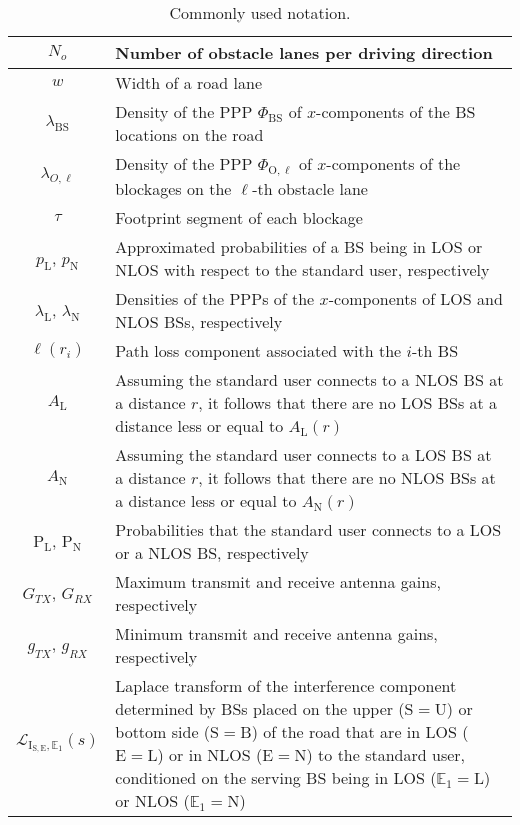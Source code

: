 \documentclass[10pt,journal,a4paper]{IEEEtran}
\begin{document}
\begin{table}[t!]
\centering
\caption{Commonly used notation.}
\label{tab.not}
{\scriptsize
\begin{tabular}{|c|p{6.5cm}|}
\hline $N_o$  & Number of obstacle lanes per driving direction\\
\hline $w$  & Width of a road lane\\
\hline $\lambda_{\mathrm{BS}}$  & Density of the PPP $\Phi_{\mathrm{BS}}$ of $x$-components of the BS locations on the road\\
\hline $\lambda_{O,\ell}$  & Density of the PPP $\Phi_{\mathrm{O},\ell}$ of $x$-components of the blockages on the $\ell$-th obstacle lane\\
\hline $\tau$  & Footprint segment of each blockage\\
\hline $p_\mathrm{L}$, $p_\mathrm{N}$  & Approximated probabilities of a BS being in LOS or NLOS with respect to the standard user, respectively\\
\hline $\lambda_\mathrm{L}$, $\lambda_\mathrm{N}$  & Densities of the PPPs of the $x$-components of LOS and NLOS BSs, respectively\\
\hline $\ell(r_i)$  & Path loss component associated with the $i$-th BS\\
\hline $A_\mathrm{L}$  & Assuming the standard user connects to a NLOS BS at a distance $r$, it follows that there are no LOS BSs at a distance less or equal to $A_{\mathrm{L}}(r)$\\
\hline $A_\mathrm{N}$  & Assuming the standard user connects to a LOS BS at a distance $r$, it follows that there are no NLOS BSs at a distance less or equal to $A_{\mathrm{N}}(r)$\\
\hline $\mathrm{P}_\mathrm{L}$, $\mathrm{P}_\mathrm{N}$  & Probabilities that the standard user connects to a LOS or a NLOS BS, respectively\\
\hline $G_{TX}$, $G_{RX}$  & Maximum transmit and receive antenna gains, respectively\\
\hline $g_{TX}$, $g_{RX}$  & Minimum transmit and receive antenna gains, respectively\\
\hline $\mathcal{L}_{\mathrm{I}_{\mathrm{S,E}},\mathbb{E}_1}(s)$  & Laplace transform of the interference component determined by BSs placed on the upper ($\mathrm{S} = \mathrm{U}$) or bottom side ($\mathrm{S} = \mathrm{B}$) of the road that are in LOS ($\mathrm{E} = \mathrm{L}$) or in NLOS ($\mathrm{E} = \mathrm{N}$) to the standard user, conditioned on the serving BS being in LOS ($\mathbb{E}_1 = \mathrm{L}$) or NLOS ($\mathbb{E}_1 = \mathrm{N}$)\\

\end{tabular}}
\end{table}
\end{document}
